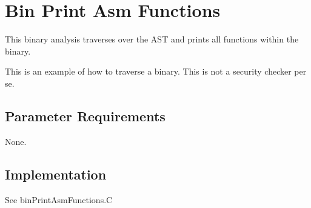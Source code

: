 %
%

\section{Bin Print Asm Functions}
\label{BinPrintAsmFunctions::overview}

This binary analysis traverses over the AST and prints all functions within the binary.

This is an example of how to traverse a binary. This is not a security checker per se.

\subsection{Parameter Requirements}

None.

\subsection{Implementation}

See binPrintAsmFunctions.C


